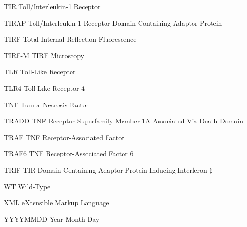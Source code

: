 \begin{spacing}{0.75}
\begin{abbreviations}
\item[TIR] Toll/Interleukin-1 Receptor
\item[TIRAP] Toll/Interleukin-1 Receptor Domain-Containing Adaptor Protein
\item[TIRF] Total Internal Reflection Fluorescence
\item[TIRF-M] TIRF Microscopy
\item[TLR] Toll-Like Receptor
\item[TLR4] Toll-Like Receptor 4
\item[TNF] Tumor Necrosis Factor
\item[TRADD] TNF Receptor Superfamily Member 1A-Associated Via Death Domain
\item[TRAF] TNF Receptor-Associated Factor
\item[TRAF6] TNF Receptor-Associated Factor 6
\item[TRIF] TIR Domain-Containing Adaptor Protein Inducing Interferon-β
\item[WT] Wild-Type
\item[XML] eXtensible Markup Language
\item[YYYYMMDD] Year Month Day


\end{abbreviations}
\end{spacing}
